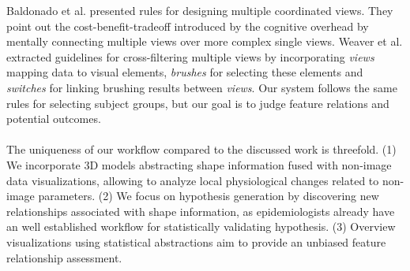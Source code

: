 \documentclass[journal]{style/vgtc} 			          %
\begin{document}
Baldonado et al. \cite{Baldonado2000} presented rules for designing multiple coordinated views.
%
They point out the cost-benefit-tradeoff introduced by the cognitive overhead by mentally connecting multiple views over more complex single views. %
%
Weaver et al. \cite{Weaver2010} extracted guidelines for cross-filtering multiple views by incorporating \emph{views} mapping data to visual elements, \emph{brushes} for selecting these elements and \emph{switches} for linking brushing results between \emph{views}.
%
Our system follows the same rules for selecting subject groups, but our goal is to judge feature relations and potential outcomes.
\\\\
The uniqueness of our workflow compared to the discussed work is threefold.
%
(1) We incorporate 3D models abstracting shape information fused with non-image data visualizations, allowing to analyze local physiological changes related to non-image parameters.
%
(2) We focus on hypothesis generation by discovering new relationships associated with shape information, as epidemiologists already have an well established workflow for statistically validating hypothesis.
%
(3) Overview visualizations using statistical abstractions aim to provide an unbiased feature relationship assessment.

\end{document}

